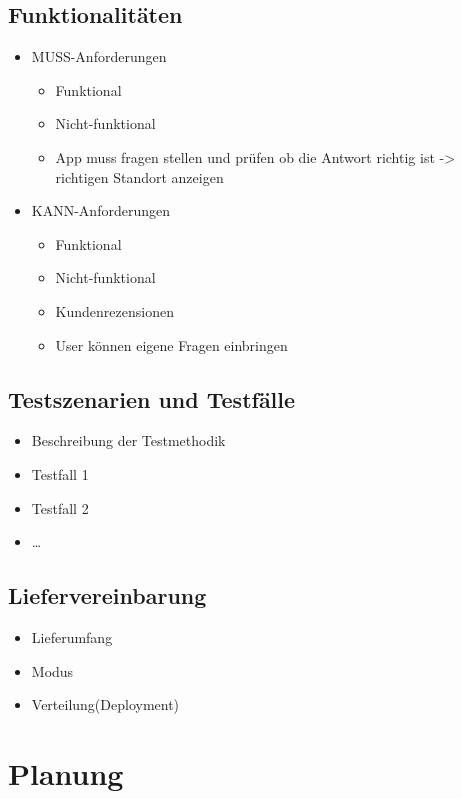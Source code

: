 \subsection{Funktionalitäten}
\begin{itemize}
	\item MUSS-Anforderungen
	\begin{itemize}
		\item Funktional
		\item Nicht-funktional
		\item App muss fragen stellen und prüfen ob die Antwort richtig ist -> richtigen Standort anzeigen
	\end{itemize}
	\item KANN-Anforderungen
	\begin{itemize}
		\item Funktional
		\item Nicht-funktional
		\item Kundenrezensionen 
		\item User können eigene Fragen einbringen
	\end{itemize}
\end{itemize}
\subsection{Testszenarien und Testfälle}
\begin{itemize}
	\item Beschreibung der Testmethodik
	\item Testfall 1
	\item Testfall 2
	\item \ldots
\end{itemize}
\subsection{Liefervereinbarung}
\begin{itemize}
	\item Lieferumfang
	\item Modus
	\item Verteilung(Deployment)
\end{itemize}
\section{Planung}
